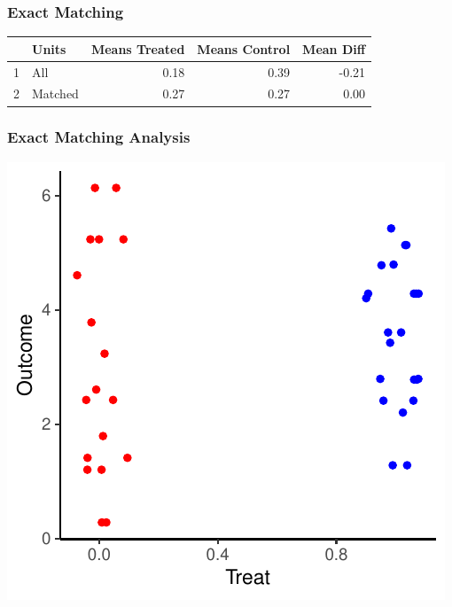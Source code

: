 \documentclass[xcolor=x11names,compress]{beamer}\usepackage[]{graphicx}\usepackage[]{color}
\makeatletter
\def\maxwidth{ %
  \ifdim\Gin@nat@width>\linewidth
    \linewidth
  \else
    \Gin@nat@width
  \fi
}
\newenvironment{knitrout}{}{} %
\renewcommand{\(}{\begin{columns}}
\renewcommand{\)}{\end{columns}}
\newcommand{\<}[1]{\begin{column}{#1}}
\renewcommand{\>}{\end{column}}
\makeatother
\begin{document}
\begin{frame}
\frametitle{Exact Matching}
\begin{center}
\begin{table}[ht]
\centering
\begin{tabular}{rlrrr}
  \hline
 & Units & Means Treated & Means Control & Mean Diff \\ 
  \hline
1 & All & 0.18 & 0.39 & -0.21 \\ 
  2 & Matched & 0.27 & 0.27 & 0.00 \\ 
   \hline
\end{tabular}
\end{table}

\end{center}
\end{frame}

\begin{frame}
\frametitle{Exact Matching Analysis}
\begin{center}
\begin{knitrout}
\color{fgcolor}
\includegraphics[width=\maxwidth]{figure/exact_matching_analysis0-1} 

\end{knitrout}
\end{center}
\end{frame}
\end{document}

